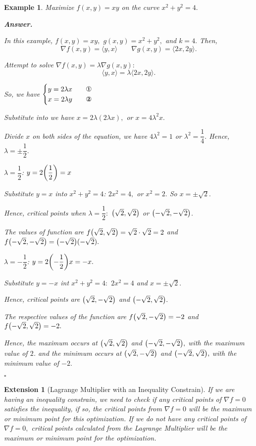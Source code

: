 \documentclass[12pt,a4paper]{article}
\newtheorem{eg}{Example}[subsection]
\newenvironment*{ans}{\par\indent\textbf{\textit{Answer. }}\par}{\par\hfill{$\square$}\par}
\newtheorem*{ext}{\indent Extension}
\begin{document}
\begin{eg}
Maximize $f(x,y)=xy$ on the curve $x^2+y^2=4.$
\begin{ans}
	In this example, $f(x,y)=xy,$ $g(x,y)=x^2+y^2,$ and $k=4.$ Then, \[\nabla f(x,y)=\langle y, x\rangle\qquad \nabla g(x,y)=\langle 2x, 2y\rangle.\]\par Attempt to solve $\nabla f(x,y)=\lambda\nabla g(x,y): $\[\langle y,x\rangle=\lambda\langle 2x,2y\rangle.\]\par So, we have $\begin{cases}y=2\lambda x\qquad\text{\ding{172}}\\x=2\lambda y\qquad\text{\ding{173}}\end{cases}$\par Substitute  into  we have $x=2\lambda(2\lambda x),$ or $x=4\lambda^2x.$\par Divide $x$ on both sides of the equation, we have $4\lambda^2=1$ or $\lambda^2=\dfrac{1}{4}.$ Hence, $\lambda=\pm\dfrac{1}{2}.$\par $\boxed{\lambda=\dfrac{1}{2}}$: $y=2\qty(\dfrac{1}{2})=x$\par\hspace{5mm} Substitute $y=x$ into $x^2+y^2=4$: $2x^2=4,$ or $x^2=2.$ So $x=\pm\sqrt{2}.$\par\hspace{5mm} Hence, critical points when $\lambda=\dfrac{1}{2}:$ $\qty(\sqrt{2},\sqrt{2})$ or $\qty(-\sqrt{2},-\sqrt{2})$.\par\hspace{5mm} The values of function are $f\qty(\sqrt{2},\sqrt{2})=\sqrt{2}\cdot\sqrt{2}=2$ and $f\qty(-\sqrt{2},-\sqrt{2})=\qty(-\sqrt{2})(-\sqrt{2}).$\par $\boxed{\lambda=-\dfrac{1}{2}}$: $y=2\qty(-\dfrac{1}{2})x=-x.$\par\hspace{5mm} Substitute $y=-x$ int $x^2+y^2=4:$ $2x^2=4$ and $x=\pm\sqrt{2}.$\par\hspace{5mm} Hence, critical points are $\qty(\sqrt{2},-\sqrt{2})$ and $\qty(-\sqrt{2},\sqrt{2}).$\par\hspace{5mm} The respective values of the function are $f\qty(\sqrt{2},-\sqrt{2})=-2$ and $f\qty(-\sqrt{2},\sqrt{2})=-2.$\par Hence, the maximum occurs at $\qty(\sqrt{2},\sqrt{2})$ and $\qty(-\sqrt{2},-\sqrt{2}),$ with the maximum value of $2$. and the minimum occurs at $\qty(\sqrt{2},-\sqrt{2})$ and $\qty(-\sqrt{2},\sqrt{2}),$ with the minimum value of $-2.$
\end{ans}	
\end{eg}
\begin{ext}[Lagrange Multiplier with an Inequality Constrain]
	If we are having an inequality constrain, we need to check if any critical points of $\nabla f=0$ satisfies the inequality, if so, the critical points from $\nabla f=0$ will be the maximum or minimum point for this optimization. If we do not have any critical points of $\nabla f=0,$ critical points calculated from the Lagrange Multiplier will be the maximum or minimum point for the optimization. 
\end{ext}
\end{document}
